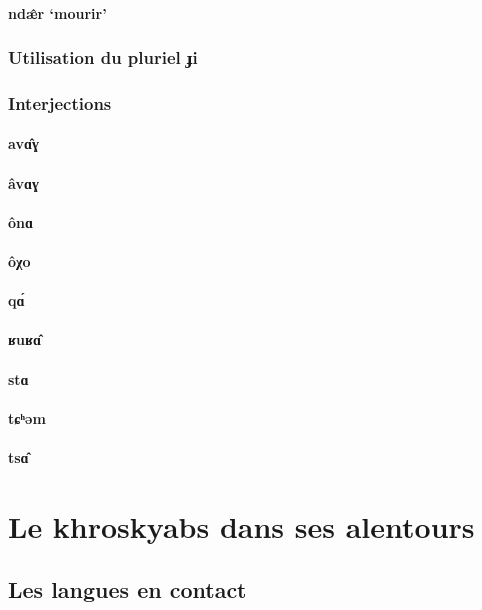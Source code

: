 \documentclass[11pt, a4paper]{book}              %
\newcommand{\ipa}[1]{{\phon \mbox{#1}}} %
\begin{document}
\subsection{\ipa{ndæ̂r} `mourir'}

\section{Utilisation du pluriel \ipa{ɟi}}
\section{Interjections}
\subsection{\ipa{avɑ̂ɣ}}
\subsection{\ipa{âvɑɣ}}
\subsection{\ipa{ônɑ}}
\subsection{\ipa{ôχo}}
\subsection{\ipa{qɑ́}}
\subsection{\ipa{ʁuʁɑ̂}}
\subsection{\ipa{stɑ}}
\subsection{\ipa{tɕʰəm}}
\subsection{\ipa{tsɑ̂}}

\part{Le khroskyabs dans ses alentours}
\chapter{Les langues en contact}
\end{document}
